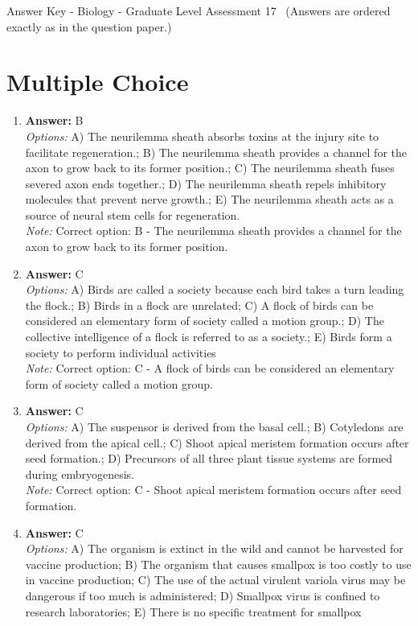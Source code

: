 \documentclass[12pt]{article}
\begin{document}
\begin{center}
Answer Key - Biology - Graduate Level Assessment 17 \
\small (Answers are ordered exactly as in the question paper.)
\end{center}

\section*{Multiple Choice}
\begin{enumerate}[label=\arabic*.]
\item \textbf{Answer:} B
\\ \textit{Options:} A) The neurilemma sheath absorbs toxins at the injury site to facilitate regeneration.; B) The neurilemma sheath provides a channel for the axon to grow back to its former position.; C) The neurilemma sheath fuses severed axon ends together.; D) The neurilemma sheath repels inhibitory molecules that prevent nerve growth.; E) The neurilemma sheath acts as a source of neural stem cells for regeneration.
\\ \textit{Note:} Correct option: B - The neurilemma sheath provides a channel for the axon to grow back to its former position.
\item \textbf{Answer:} C
\\ \textit{Options:} A) Birds are called a society because each bird takes a turn leading the flock.; B) Birds in a flock are unrelated; C) A flock of birds can be considered an elementary form of society called a motion group.; D) The collective intelligence of a flock is referred to as a society.; E) Birds form a society to perform individual activities
\\ \textit{Note:} Correct option: C - A flock of birds can be considered an elementary form of society called a motion group.
\item \textbf{Answer:} C
\\ \textit{Options:} A) The suspensor is derived from the basal cell.; B) Cotyledons are derived from the apical cell.; C) Shoot apical meristem formation occurs after seed formation.; D) Precursors of all three plant tissue systems are formed during embryogenesis.
\\ \textit{Note:} Correct option: C - Shoot apical meristem formation occurs after seed formation.
\item \textbf{Answer:} C
\\ \textit{Options:} A) The organism is extinct in the wild and cannot be harvested for vaccine production; B) The organism that causes smallpox is too costly to use in vaccine production; C) The use of the actual virulent variola virus may be dangerous if too much is administered; D) Smallpox virus is confined to research laboratories; E) There is no specific treatment for smallpox

\end{enumerate}
\end{document}
